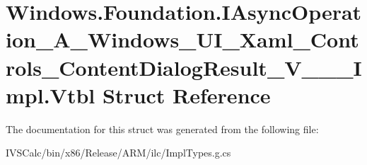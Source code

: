 \hypertarget{struct_windows_1_1_foundation_1_1_i_async_operation___a___windows___u_i___xaml___controls___cont9e642e9026406c25f32db240b351c280}{}\section{Windows.\+Foundation.\+I\+Async\+Operation\+\_\+\+A\+\_\+\+Windows\+\_\+\+U\+I\+\_\+\+Xaml\+\_\+\+Controls\+\_\+\+Content\+Dialog\+Result\+\_\+\+V\+\_\+\+\_\+\+\_\+\+Impl.\+Vtbl Struct Reference}
\label{struct_windows_1_1_foundation_1_1_i_async_operation___a___windows___u_i___xaml___controls___cont9e642e9026406c25f32db240b351c280}


The documentation for this struct was generated from the following file\+:\begin{DoxyCompactItemize}
\item 
I\+V\+S\+Calc/bin/x86/\+Release/\+A\+R\+M/ilc/Impl\+Types.\+g.\+cs\end{DoxyCompactItemize}
